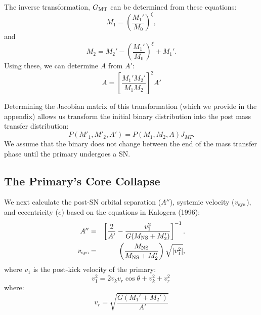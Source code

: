 \documentclass[12pt, preprint]{aastex}
\begin{document}
The inverse transformation, $G_{\rm MT}$ can be determined from these equations:
\begin{equation}
M_1 = \left( \frac{M_1'}{M_0} \right)^{\xi}, 
\end{equation}
and
\begin{equation}
M_2 = M_2' - \left( \frac{M_1'}{M_0} \right)^{\xi} + M_1'.
\end{equation}
Using these, we can determine $A$ from $A'$:
\begin{equation}
A = \left[ \frac{M_1' M_2'}{M_1 M_2} \right]^2 A'
\end{equation}



Determining the Jacobian matrix of this transformation (which we provide in the appendix) allows us transform the initial binary distribution into the post mass transfer distribution:
\begin{equation}
P(M'_1, M'_2, A') = P(M_1, M_2, A) J_{MT}. \label{eq:P_MT}
\end{equation}
We assume that the binary does not change between the end of the mass transfer phase until the primary undergoes a SN. 




\subsection{The Primary's Core Collapse} \label{sec:trans_SN}

We next calculate the post-SN orbital separation ($A''$), systemic velocity ($v_{\rm sys}$), and eccentricity ($e$) based on the equations in Kalogera (1996):
\begin{eqnarray}
A'' &=& \left[ \frac{2 }{A'}  - \frac{v_1^2}{G(M_{\rm NS} + M_2')} \right]^{-1}. \label{eq:SN_A} \\
v_{\rm sys} &=& \left( \frac{M_{\rm NS}}{M_{\rm NS} + M_2'} \right) \sqrt{ |v_1^2| }, \label{eq:SN_v_sys}
\end{eqnarray}
where $v_1$ is the post-kick velocity of the primary:
\begin{equation}
v_1^2 = 2v_k v_r \cos \theta + v_k^2 + v_r^2\, 
\end{equation}
where:
\begin{equation}
v_r = \sqrt{\frac{G (M_1' + M_2')}{A'}} \label{eq:v_r}
\end{equation}
\end{document}
